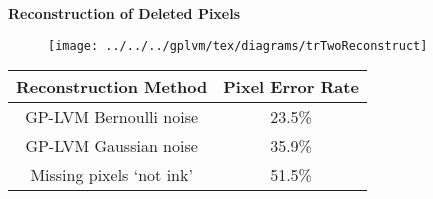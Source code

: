 \textbf{Reconstruction of Deleted Pixels}

%
\begin{figure}
\centering{}\texttt{[image: ../../../gplvm/tex/diagrams/trTwoReconstruct]}
\end{figure}


\begin{center}
\begin{tabular}{|c|c|}
\hline 
Reconstruction Method & Pixel Error Rate\tabularnewline
\hline
\hline 
GP-LVM Bernoulli noise & 23.5\%\tabularnewline
\hline 
GP-LVM Gaussian noise & 35.9\%\tabularnewline
\hline 
Missing pixels `not ink' & 51.5\%\tabularnewline
\hline
\end{tabular}
\par\end{center}

\begin{flushright}

\par\end{flushright}


